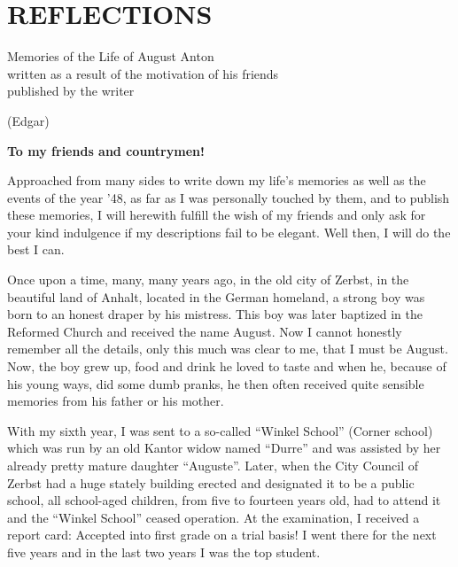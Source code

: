 \section{REFLECTIONS}\label{reflections}

Memories of the Life of August Anton\\
written as a result of the motivation of his friends\\
published by the writer

(Edgar)

\textbf{To my friends and countrymen!}

Approached from many sides to write down my life's memories as well as the events of the year '48, as far as I was personally touched by them, and to publish these memories, I will herewith fulfill the wish of my friends and only ask for your kind indulgence if my descriptions fail to be elegant. Well then, I will do the best I can.

Once upon a time, many, many years ago, in the old city of Zerbst, in the beautiful land of Anhalt, located in the German homeland, a strong boy was born to an honest draper by his mistress. This boy was later baptized in the Reformed Church and received the name August. Now I cannot honestly remember all the details, only this much was clear to me, that I must be August. Now, the boy grew up, food and drink he loved to taste and when he, because of his young ways, did some dumb pranks, he then often received quite sensible memories from his father or his mother.

With my sixth year, I was sent to a so-called ``Winkel School'' (Corner school) which was run by an old Kantor widow named ``Durre'' and was assisted by her already pretty mature daughter ``Auguste''. Later, when the City Council of Zerbst had a huge stately building erected and designated it to be a public school, all school-aged children, from five to fourteen years old, had to attend it and the ``Winkel School'' ceased operation. At the examination, I received a report card: Accepted into first grade on a trial basis! I went there for the next five years and in the last two years I was the top student.

